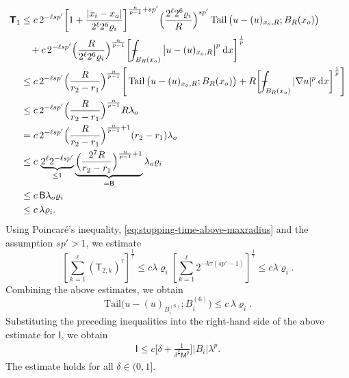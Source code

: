 \documentclass[10pt,letterpaper]{amsart}
\theoremstyle{definition}
\numberwithin{theorem}{section}
\numberwithin{equation}{section}
\newcommand{\1}{\ensuremath{\mathds{1}}}
\newcommand{\dx}{\mathrm{d}x}
\newcommand\sfI{{\boldsymbol{\mathsf I}}}
\newcommand\sfT{{\boldsymbol{\mathsf T}}}
\def\Xint#1{\mathchoice
    {\XXint\displaystyle\textstyle{#1}}%
    {\XXint\textstyle\scriptstyle{#1}}%
    {\XXint\scriptstyle\scriptscriptstyle{#1}}%
    {\XXint\scriptscriptstyle\scriptscriptstyle{#1}}%
    \!\int}
\def\XXint#1#2#3{\setbox0=\hbox{$#1{#2#3}{\int}$}
    \vcenter{\hbox{$#2#3$}}\kern-0.5\wd0}
\def\bint{\Xint-}
\renewcommand{\rho}{\varrho}
\renewcommand{\rho}{\varrho}
\renewcommand{\d}{\:\! \mathrm{d}}
\DeclareMathOperator{\Tail}{Tail}
\numberwithin{equation}{section}
\begin{document}
\begin{align*}
    \sfT_1 
    &\le 
    c\, 2^{-\ell sp'}\bigg[1 + \frac{|x_i-x_o|}{2^\ell 2^6\rho_i}\bigg]^{\frac{n}{p-1}+sp'} 
    \Big(\frac{2^\ell 2^6\rho_i}{R}\Big)^{sp'} \Tail \big(u-(u)_{x_o,R}; B_R(x_o)\big) \\
    &\phantom{\le\,} + 
    c\, 2^{-\ell sp'}\Big(\frac{R}{2^\ell 2^6\rho_i}\Big)^{\frac{n}{p-1}}
    \bigg[ \bint_{B_{R}(x_o)} \big|u-(u)_{x_o,R}\big|^{p} \, \d x \bigg]^\frac{1}{p} \\
    &\le 
    c\,2^{-\ell sp'}\Big(\frac{R}{r_2-r_1}\Big)^{\frac{n}{p-1}} 
    \Bigg[ \Tail \big(u-(u)_{x_o,R}; B_R(x_o)\big) + 
    R\bigg[ \bint_{B_{R}(x_o)} |\nabla u|^{p} \, \d x \bigg]^\frac{1}{p} \Bigg] \\
    &\le 
    c\,2^{-\ell sp'}\Big(\frac{R}{r_2-r_1}\Big)^{\frac{n}{p-1}} 
    R \lambda_o \\
    &= 
    c\,2^{-\ell sp'}\Big(\frac{R}{r_2-r_1}\Big)^{\frac{n}{p-1}+1} 
    (r_2-r_1) \lambda_o \\
    &\le 
    c\,\underbrace{2^\ell 2^{-\ell sp'}}_{\le 1}
    \underbrace{\Big(\frac{2^7R}{r_2-r_1}\Big)^{\frac{n}{p-1}+1}}_{={\sf B}}\lambda_o
    \rho_i\\
    &\le c\,{\sf B} \lambda_o\rho_i\\
    &
    \le 
    c\,\lambda\rho_i.
\end{align*}
Using Poincar\'e's inequality, \eqref{eq:stopping-time-above-maxradius} and the assumption $sp'>1$, we estimate
    $$
    \left[ \sum_{k=1}^\ell (\sfT_{2,k})^{\tau} \right]^\frac{1}{\tau} \leq c   \lambda \rho_i \left[ \sum_{k=1}^\ell 2^{-k\tau (sp'-1)}\right]^\frac{1}{\tau} \leq  c  \lambda \rho_i.
    $$
Combining the above estimates, we obtain
\begin{equation}\label{est:tail-B5}
     \mathrm{Tail} \big(u-(u)_{B_i^{(6)}}; B_i^{(6)}\big)
    \le c\,\lambda\rho_i.
\end{equation}
Substituting the preceding inequalities into the right-hand side of the
above estimate for $\sfI$, we obtain
\begin{align*}%
    \sfI 
    \le 
    c \bigg[\delta + 
    \frac{1}{\delta^\frac{p}{\gamma} \mathsf M^p}\bigg]  |B_i| 
    \lambda^p
    .
\end{align*}
The estimate holds for all $\delta\in(0,1]$.
\end{document}
